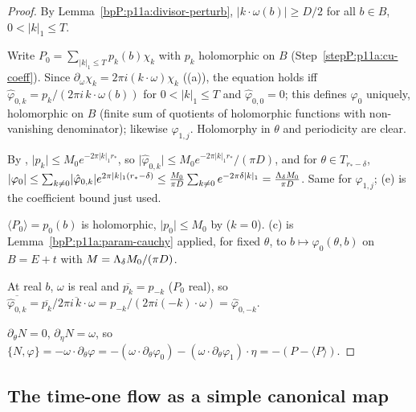 \begin{proof}
\label{stepP:p11a:hm-div} By Lemma~\ref{bpP:p11a:divisor-perturb}, $\lvert k\cdot\omega(b)\rvert\ge D/2$ for all $b\in B$, $0<\lvert k\rvert_1\le T$.

\label{stepP:p11a:hm-coeff} Write $P_0=\sum_{\lvert k\rvert_1\le T}p_k(b)\chi_k$ with $p_k$ holomorphic on $B$ (Step~\ref{stepP:p11a:cu-coeff}). Since $\partial_\omega\chi_k=2\pi i(k\cdot\omega)\chi_k$ ((a)), the equation holds iff $\hat\varphi_{0,k}=p_k/(2\pi i\,k\cdot\omega(b))$ for $0<\lvert k\rvert_1\le T$ and $\hat\varphi_{0,0}=0$; this defines $\varphi_0$ uniquely, holomorphic on $B$ (finite sum of quotients of holomorphic functions with non-vanishing denominator); likewise $\varphi_{1,j}$. Holomorphy in $\theta$ and periodicity are clear.

\label{stepP:p11a:hm-a} By , $\lvert p_k\rvert\le M_0e^{-2\pi\lvert k\rvert_1r_*}$, so $\lvert\hat\varphi_{0,k}\rvert\le M_0e^{-2\pi\lvert k\rvert_1r_*}/(\pi D)$, and for $\theta\in T_{r_*-\delta}$, $\lvert\varphi_0\rvert\le\sum_{k\ne0}\lvert\hat\varphi_{0,k}\rvert e^{2\pi\lvert k\rvert_1(r_*-\delta)}\le\frac{M_0}{\pi D}\sum_{k\ne0}e^{-2\pi\delta\lvert k\rvert_1}=\frac{\Lambda_{\delta} M_0}{\pi D}$. Same for $\varphi_{1,j}$; (e) is the coefficient bound just used.

\label{stepP:p11a:hm-bc} $\langle P_0\rangle=p_0(b)$ is holomorphic, $\lvert p_0\rvert\le M_0$ by  ($k=0$). (c) is Lemma~\ref{bpP:p11a:param-cauchy} applied, for fixed $\theta$, to $b\mapsto\varphi_0(\theta,b)$ on $B=E+t$ with $M=\Lambda_{\delta} M_0/(\pi D)$.

\label{stepP:p11a:hm-d} At real $b$, $\omega$ is real and $\overline{p_{k}}=p_{-k}$ ($P_0$ real), so $\overline{\hat\varphi_{0,k}}=\overline{p_k}/\overline{2\pi i\,k\cdot\omega}=p_{-k}/(2\pi i(-k)\cdot\omega)=\hat\varphi_{0,-k}$.

\label{stepP:p11a:hm-bracket} $\partial_\theta N=0$, $\partial_\eta N=\omega$, so $\{N,\varphi\}=-\omega\cdot\partial_\theta\varphi=-(\omega\cdot\partial_\theta\varphi_0)-(\omega\cdot\partial_\theta\varphi_1)\cdot\eta=-(P-\langle P\rangle)$.
\end{proof}

\subsection{The time-one flow as a simple canonical map}\label{bpP:p11a:sec-flow}

